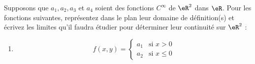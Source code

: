 
\begin{exercice}\label{exo0043}

Supposons que $a_1, a_2, a_3$ et $a_4$ soient des fonctions $C^\infty$ de $\eR^2$ dans $\eR$. Pour les fonctions suivantes, représentez dans le plan leur domaine de définition(s) et écrivez les limites qu'il faudra étudier pour déterminer leur continuité sur $\eR^2$ :

\begin{multicols}{2}
\begin{enumerate}
	\item
	\begin{equation}
		f(x,y)=
		\begin{cases}
			a_1	&	\text{si $x>0$}\\
			a_2	&	 \text{si $x\leq 0$}
		\end{cases}
	\end{equation}



\end{enumerate}
\end{multicols}
\end{exercice}
